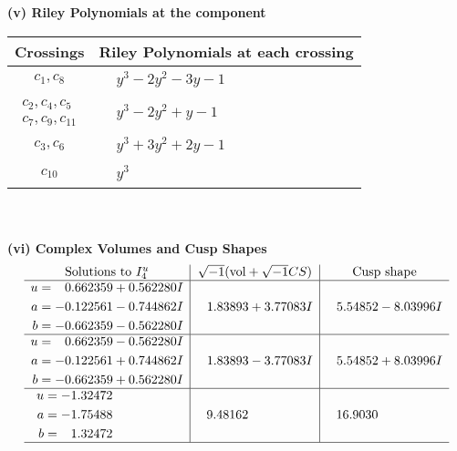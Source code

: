 \documentclass[1p]{elsarticle_modified}
\theoremstyle{definition}
\newcommand{\I}{\sqrt{-1}}
\begin{document}
\newpage\renewcommand{\arraystretch}{1}
\flushleft \textbf{(v) Riley Polynomials at the component}\newline \\
\begin{tabular}{m{50pt}|m{274pt}}
Crossings & \hspace{64pt}Riley Polynomials at each crossing \\
\hline $$\begin{aligned}c_{1},c_{8}\end{aligned}$$&$\begin{aligned}
&y^3-2 y^2-3 y-1
\end{aligned}$\\
\hline $$\begin{aligned}c_{2},c_{4},c_{5}\\c_{7},c_{9},c_{11}\end{aligned}$$&$\begin{aligned}
&y^3-2 y^2+y-1
\end{aligned}$\\
\hline $$\begin{aligned}c_{3},c_{6}\end{aligned}$$&$\begin{aligned}
&y^3+3 y^2+2 y-1
\end{aligned}$\\
\hline $$\begin{aligned}c_{10}\end{aligned}$$&$\begin{aligned}
&y^3
\end{aligned}$\\
\hline
\end{tabular}\\~\\
\newpage\flushleft \textbf{(vi) Complex Volumes and Cusp Shapes}
$$\begin{array}{c|c|c}  
\text{Solutions to }I^u_{4}& \I (\text{vol} + \sqrt{-1}CS) & \text{Cusp shape}\\
 \hline 
\begin{aligned}
u &= \phantom{-}0.662359 + 0.562280 I \\
a &= -0.122561 - 0.744862 I \\
b &= -0.662359 - 0.562280 I\end{aligned}
 & \phantom{-}1.83893 + 3.77083 I & \phantom{-}5.54852 - 8.03996 I \\ \hline\begin{aligned}
u &= \phantom{-}0.662359 - 0.562280 I \\
a &= -0.122561 + 0.744862 I \\
b &= -0.662359 + 0.562280 I\end{aligned}
 & \phantom{-}1.83893 - 3.77083 I & \phantom{-}5.54852 + 8.03996 I \\ \hline\begin{aligned}
u &= -1.32472\phantom{ +0.000000I} \\
a &= -1.75488\phantom{ +0.000000I} \\
b &= \phantom{-}1.32472\phantom{ +0.000000I}\end{aligned}
 & \phantom{-}9.48162\phantom{ +0.000000I} & \phantom{-}16.9030\phantom{ +0.000000I}\\
 \hline 
 \end{array}$$\newpage
\end{document}
